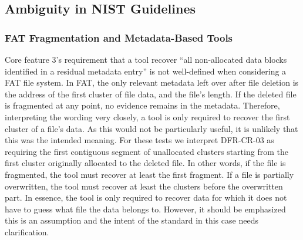 \subsection{Ambiguity in NIST Guidelines}
\subsubsection{FAT Fragmentation and Metadata-Based Tools}
\begin{paraphrase}
Core feature 3's requirement that a tool recover ``all non-allocated data blocks identified in a residual metadata entry''\cite{meta:dfr:standards} is not well-defined when considering a FAT file system. 
In FAT, the only relevant metadata left over after file deletion is the address of the first cluster of file data, and the file's length. 
If the deleted file is fragmented at any point, no evidence remains in the metadata. 
Therefore, interpreting the wording very closely, a tool is only required to recover the first cluster of a file's data. 
As this would not be particularly useful, it is unlikely that this was the intended meaning. 
For these tests we interpret DFR-CR-03 as requiring the first contiguous segment of unallocated clusters starting from the first cluster originally allocated to the deleted file. 
In other words, if the file is fragmented, the tool must recover at least the first fragment. 
If a file is partially overwritten, the tool must recover at least the clusters before the overwritten part.
In essence, the tool is only required to recover data for which it does not have to guess what file the data belongs to.
However, it should be emphasized this is an assumption and the intent of the standard in this case needs clarification.
\end{paraphrase}

